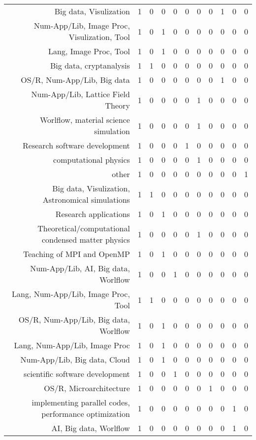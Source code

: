 {\begin{landscape}
\begin{longtable}[htb]{r|c|c|c|c|c|c|c|c|c|c}
{Big data, Visulization} & 1 & 0 & 0 & 0 & 0 & 0 & 0 & 1 & 0 & 0 \\%
{Num-App/Lib, Image Proc, Visulization, Tool} & 1 & 0 & 1 & 0 & 0 & 0 & 0 & 0 & 0 & 0 \\%
{Lang, Image Proc, Tool} & 1 & 0 & 1 & 0 & 0 & 0 & 0 & 0 & 0 & 0 \\%
{Big data, cryptanalysis} & 1 & 1 & 0 & 0 & 0 & 0 & 0 & 0 & 0 & 0 \\%
{OS/R, Num-App/Lib, Big data} & 1 & 0 & 0 & 0 & 0 & 0 & 0 & 1 & 0 & 0 \\%
{Num-App/Lib, Lattice Field Theory} & 1 & 0 & 0 & 0 & 0 & 1 & 0 & 0 & 0 & 0 \\%
{Worlflow, material science simulation} & 1 & 0 & 0 & 0 & 0 & 1 & 0 & 0 & 0 & 0 \\%
{Research software development} & 1 & 0 & 0 & 0 & 1 & 0 & 0 & 0 & 0 & 0 \\%
{computational physics} & 1 & 0 & 0 & 0 & 0 & 1 & 0 & 0 & 0 & 0 \\%
{other} & 1 & 0 & 0 & 0 & 0 & 0 & 0 & 0 & 0 & 1 \\%
{Big data, Visulization, Astronomical simulations} & 1 & 1 & 0 & 0 & 0 & 0 & 0 & 0 & 0 & 0 \\%
{Research applications} & 1 & 0 & 1 & 0 & 0 & 0 & 0 & 0 & 0 & 0 \\%
{Theoretical/computational condensed matter physics} & 1 & 0 & 0 & 0 & 0 & 1 & 0 & 0 & 0 & 0 \\%
{Teaching of MPI and OpenMP} & 1 & 0 & 1 & 0 & 0 & 0 & 0 & 0 & 0 & 0 \\%
{Num-App/Lib, AI, Big data, Worlflow} & 1 & 0 & 0 & 1 & 0 & 0 & 0 & 0 & 0 & 0 \\%
{Lang, Num-App/Lib, Image Proc, Tool} & 1 & 1 & 0 & 0 & 0 & 0 & 0 & 0 & 0 & 0 \\%
{OS/R, Num-App/Lib, Big data, Worlflow} & 1 & 0 & 1 & 0 & 0 & 0 & 0 & 0 & 0 & 0 \\%
{Lang, Num-App/Lib, Image Proc} & 1 & 0 & 1 & 0 & 0 & 0 & 0 & 0 & 0 & 0 \\%
{Num-App/Lib, Big data, Cloud} & 1 & 0 & 1 & 0 & 0 & 0 & 0 & 0 & 0 & 0 \\%
{scientific software development} & 1 & 0 & 0 & 1 & 0 & 0 & 0 & 0 & 0 & 0 \\%
{OS/R, Microarchitecture} & 1 & 0 & 0 & 0 & 0 & 0 & 1 & 0 & 0 & 0 \\%
{implementing parallel codes, performance optimization} & 1 & 0 & 0 & 0 & 0 & 0 & 0 & 0 & 1 & 0 \\%
{AI, Big data, Worlflow} & 1 & 0 & 0 & 0 & 0 & 0 & 0 & 0 & 1 & 0 \\%

\end{longtable}
\end{landscape}}
